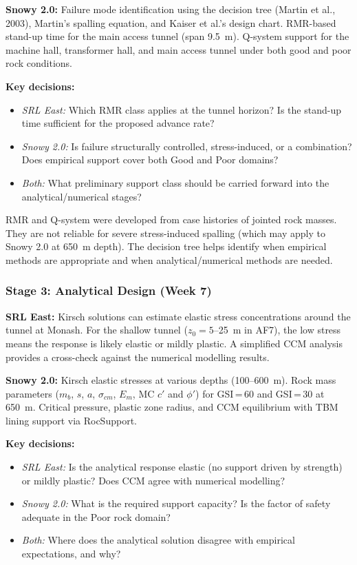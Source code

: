 \documentclass[a4paper,12pt]{article}
\begin{document}
\textbf{Snowy 2.0:} Failure mode identification using the decision tree (Martin et al., 2003), Martin's spalling equation, and Kaiser et al.'s design chart. RMR-based stand-up time for the main access tunnel (span 9.5~m). Q-system support for the machine hall, transformer hall, and main access tunnel under both good and poor rock conditions.

\textbf{Key decisions:}
\begin{itemize}[nosep]
    \item \textit{SRL East:} Which RMR class applies at the tunnel horizon? Is the stand-up time sufficient for the proposed advance rate?
    \item \textit{Snowy 2.0:} Is failure structurally controlled, stress-induced, or a combination? Does empirical support cover both Good and Poor domains?
    \item \textit{Both:} What preliminary support class should be carried forward into the analytical/numerical stages?
\end{itemize}

\begin{warnbox}
RMR and Q-system were developed from case histories of jointed rock masses. They are not reliable for severe stress-induced spalling (which may apply to Snowy 2.0 at 650~m depth). The decision tree helps identify when empirical methods are appropriate and when analytical/numerical methods are needed.
\end{warnbox}

\subsubsection{Stage 3: Analytical Design (Week 7)}

\textbf{SRL East:} Kirsch solutions can estimate elastic stress concentrations around the tunnel at Monash. For the shallow tunnel ($z_0 = 5$--25~m in AF7), the low stress means the response is likely elastic or mildly plastic. A simplified CCM analysis provides a cross-check against the numerical modelling results.

\textbf{Snowy 2.0:} Kirsch elastic stresses at various depths (100--600~m). Rock mass parameters ($m_b$, $s$, $a$, $\sigma_{cm}$, $E_m$, MC $c'$ and $\phi'$) for GSI\,=\,60 and GSI\,=\,30 at 650~m. Critical pressure, plastic zone radius, and CCM equilibrium with TBM lining support via RocSupport.

\textbf{Key decisions:}
\begin{itemize}[nosep]
    \item \textit{SRL East:} Is the analytical response elastic (no support driven by strength) or mildly plastic? Does CCM agree with numerical modelling?
    \item \textit{Snowy 2.0:} What is the required support capacity? Is the factor of safety adequate in the Poor rock domain?
    \item \textit{Both:} Where does the analytical solution disagree with empirical expectations, and why?
\end{itemize}
\end{document}

